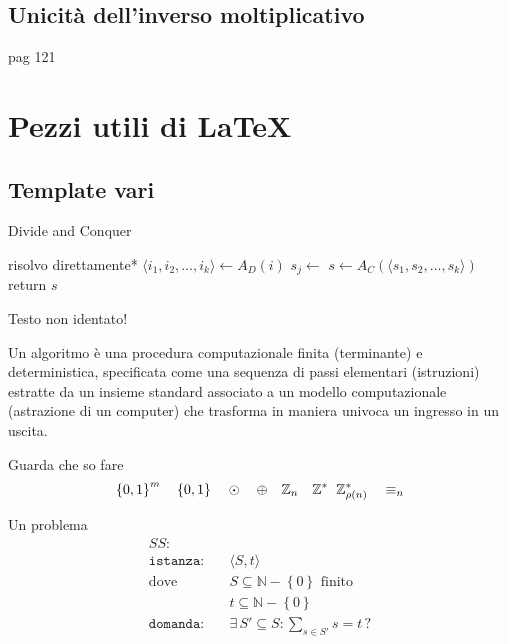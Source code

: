 \subsection{Unicità dell'inverso moltiplicativo}
pag 121


\section{Pezzi utili di \LaTeX{}}

\subsection{Template vari}

\begin{algorithm}[H]
\caption{Divide and Conquer}\label{alg:dnc}
\begin{algorithmic}[1]
            \State *risolvo direttamente*
        \EndIf
        \State $\langle i_1, i_2, \dots, i_k \rangle \gets A_D(i)$ 
            \State $s_j \gets $
        \EndFor
        \State $s \gets A_C(\langle s_1, s_2, \dots, s_k \rangle)$
        \State return $s$
    \EndProcedure
\end{algorithmic}
\end{algorithm}
\noindent
Testo non identato!

\begin{definition}[Algoritmo]\label{def:algex}
    Un algoritmo è una procedura computazionale finita (terminante) e deterministica, specificata come una sequenza di passi elementari (istruzioni) estratte da un insieme standard associato a un modello computazionale (astrazione di un computer) che trasforma in maniera univoca un ingresso in un uscita.
\end{definition}

Guarda che so fare
\begin{equation*}
    \left\{0,1\right\}^{m}
    \quad
    \left\{0,1\right\}^{}
    \quad
    \odot
    \quad
    \oplus
    \quad
    \mathbb{Z}_{n}
    \quad
    \mathbb{Z}_{\quad}^{*}
    \mathbb{Z}_{\rho(n)}^{*}
    \quad
    \equiv_n
\end{equation*}

Un problema
\begin{align*}
    SS: & \\
    \texttt{istanza:} \quad &
    \langle
        S,t
    \rangle
    \\
    \text{dove} \quad &
    S \subseteq \mathbb{N} - \left\{ 0 \right\} \text{ finito}
    \\
    &
    t \subseteq \mathbb{N} - \left\{ 0 \right\} \\
    \texttt{domanda:} \quad &
    \exists \, S' \subseteq S : \sum_{s \in S'}^{} s = t \, ?
\end{align*}

